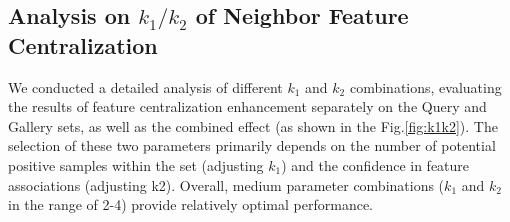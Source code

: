 \subsection{Analysis on $k_1/k_2$ of Neighbor Feature Centralization}
We conducted a detailed analysis of different $k_1$ and $k_2$ combinations, evaluating the results of feature centralization enhancement separately on the Query and Gallery sets, as well as the combined effect (as shown in the Fig.\ref{fig:k1k2}). The selection of these two parameters primarily depends on the number of potential positive samples within the set (adjusting $k_1$) and the confidence in feature associations (adjusting k2). Overall, medium parameter combinations ($k_1$ and $k_2$ in the range of 2-4) provide relatively optimal performance.































